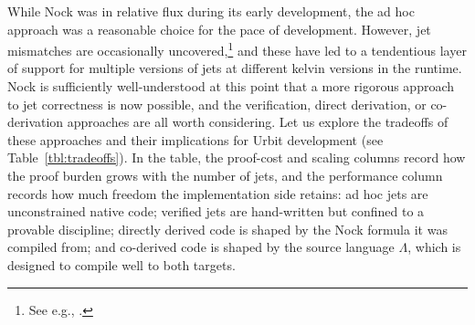 \documentclass[twoside]{article}
\begin{document}
\noindent
While Nock was in relative flux during its early development, the ad hoc approach was a reasonable choice for the pace of development.  However, jet mismatches are occasionally uncovered,\footnote{See e.g., .} and these have led to a tendentious layer of support for multiple versions of jets at different kelvin versions in the runtime.  Nock is sufficiently well-understood at this point that a more rigorous approach to jet correctness is now possible, and the verification, direct derivation, or co-derivation approaches are all worth considering.  Let us explore the tradeoffs of these approaches and their implications for Urbit development (see Table~\ref{tbl:tradeoffs}).  In the table, the proof-cost and scaling columns record how the proof burden grows with the number of jets, and the performance column records how much freedom the implementation side retains:  ad hoc jets are unconstrained native code; verified jets are hand-written but confined to a provable discipline; directly derived code is shaped by the Nock formula it was compiled from; and co-derived code is shaped by the source language $\Lambda$, which is designed to compile well to both targets.

\begin{table}[ht]
\centering
\caption{Heuristic tradeoffs of approaches to jet correctness.
\label{tbl:tradeoffs}}
\noindent{}
\end{table}
\end{document}
